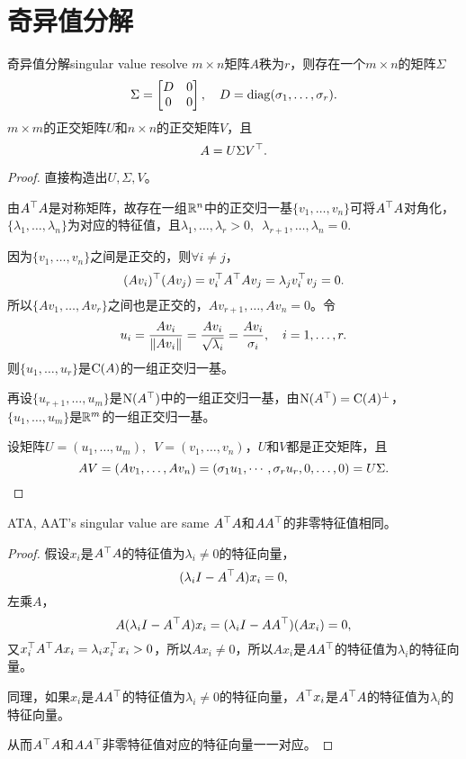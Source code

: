 \section{奇异值分解}
\begin{theorem}{奇异值分解}{singular value resolve}
	$m\times n$矩阵$A$秩为$r$，则存在一个$m\times n$的矩阵$\Sigma$ 
	\[
		\Sigma=\begin{bmatrix}
			D&0\\0&0
		\end{bmatrix},\quad D=\operatorname{diag}(\sigma_1,\ldots,\sigma_r).
	\]
	$m\times m$的正交矩阵$U$和$n\times n$的正交矩阵$V$，且 
	\[
		A=U\Sigma V^\top.
	\]
\end{theorem}
\begin{proof}
	直接构造出$U,\Sigma,V$。
	
	由$A^\top A$是对称矩阵，故存在一组$\mathbb R^n$中的正交归一基$\{v_1,\ldots,v_n\}$可将$A^\top A$对角化，$\{\lambda_1,\ldots,\lambda_n\}$为对应的特征值，且$\lambda_1,\ldots,\lambda_r>0,\enspace\lambda_{r+1},\ldots,\lambda_n=0.$
	
	因为$\{v_1,\ldots,v_n\}$之间是正交的，则$\forall i\neq j$，
	\[
		(Av_i)^\top(Av_j)=v_i^\top A^\top Av_j=\lambda_jv_i^\top v_j=0.
	\]
	所以$\{Av_1,\ldots,Av_r\}$之间也是正交的，$Av_{r+1},\ldots,Av_n=0$。令
	\[
		u_i=\frac{Av_i}{\left\lVert Av_i\right\rVert}=\frac{Av_i}{\sqrt{\lambda_i}}=\frac{Av_i}{\sigma_i},\quad i=1,\ldots,r.
	\]
	则$\{u_1,\ldots,u_r\}$是$\operatorname{C}(A)$的一组正交归一基。
	
	再设$\{u_{r+1},\ldots,u_m\}$是$\operatorname{N}(A^\top)$中的一组正交归一基，由$\operatorname{N}(A^\top)=\operatorname{C}(A)^\perp$，$\{u_1,\ldots,u_m\}$是$\mathbb R^m$的一组正交归一基。
	
	设矩阵$U=(u_1,\ldots,u_m),\enspace V=(v_1,\ldots,v_n)$，$U$和$V$都是正交矩阵，且
	\[
		AV=(Av_1,\ldots,Av_n)=(\sigma_1u_1,\cdots,\sigma_ru_r,0,\ldots,0)=U\Sigma.
		\qedhere
	\]
\end{proof}
\begin{theorem}{}{ATA, AAT's singular value are same}
	$A^\top A$和$AA^\top$的非零特征值相同。
\end{theorem}
\begin{proof}
	假设$x_i$是$A^\top A$的特征值为$\lambda_i\neq 0$的特征向量，
	\[
		(\lambda_iI-A^\top A)x_i=0,
	\]
	左乘$A$，
	\[
		A(\lambda_iI-A^\top A)x_i=(\lambda_iI-AA^\top)(Ax_i)=0,
	\]
	又$x_i^\top A^\top Ax_i=\lambda_i x_i^\top x_i>0$，所以$Ax_i\neq 0$，所以$Ax_i$是$AA^\top$的特征值为$\lambda_i$的特征向量。
	
	同理，如果$x_i$是$AA^\top$的特征值为$\lambda_i\neq 0$的特征向量，$A^\top x_i$是$A^\top A$的特征值为$\lambda_i$的特征向量。
	
	从而$A^\top A$和$AA^\top$非零特征值对应的特征向量一一对应。
\end{proof}
